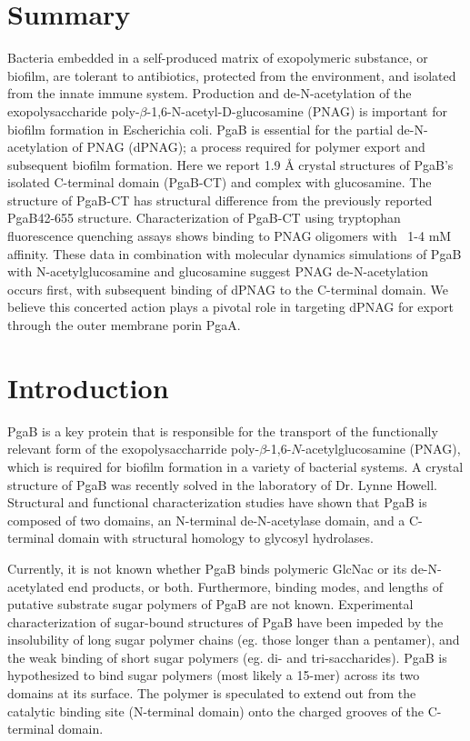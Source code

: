 \section{Summary}
Bacteria embedded in a self-produced matrix of exopolymeric substance, or biofilm, are tolerant to antibiotics, protected from the environment, and isolated from the innate immune system. Production and de-N-acetylation of the exopolysaccharide poly-$\beta$-1,6-N-acetyl-D-glucosamine (PNAG) is important for biofilm formation in Escherichia coli. PgaB is essential for the partial de-N-acetylation of PNAG (dPNAG); a process required for polymer export and subsequent biofilm formation. Here we report 1.9 Å crystal structures of PgaB’s isolated C-terminal domain (PgaB-CT) and complex with glucosamine. The structure of PgaB-CT has structural difference from the previously reported PgaB42-655 structure. Characterization of PgaB-CT using tryptophan fluorescence quenching assays shows binding to PNAG oligomers with ~1-4 mM affinity. These data in combination with molecular dynamics simulations of PgaB with N-acetylglucosamine and glucosamine suggest PNAG de-N-acetylation occurs first, with subsequent binding of dPNAG to the C-terminal domain. We believe this concerted action plays a pivotal role in targeting dPNAG for export through the outer membrane porin PgaA.

\section{Introduction}

PgaB is a key protein that is responsible for the transport of the functionally relevant form of the exopolysaccharride poly-$\beta$-1,6-$N$-acetylglucosamine (PNAG), which is required for biofilm formation in a variety of bacterial systems. A crystal structure of PgaB was recently solved in the laboratory of Dr. Lynne Howell. Structural and functional characterization studies have shown that PgaB is composed of two domains, an N-terminal de-N-acetylase domain, and a C-terminal domain with structural homology to glycosyl hydrolases.\cite{Little:2012dp}

Currently, it is not known whether PgaB binds polymeric GlcNac or its de-N-acetylated end products, or both. Furthermore, binding modes, and lengths of putative substrate sugar polymers of PgaB are not known. Experimental characterization of sugar-bound structures of PgaB have been impeded by the insolubility of long sugar polymer chains (eg. those longer than a pentamer), and the weak binding of short sugar polymers (eg. di- and tri-saccharides). PgaB is hypothesized to bind sugar polymers (most likely a 15-mer) across its two domains at its surface. The polymer is speculated to extend out from the catalytic binding site (N-terminal domain) onto the charged grooves of the C-terminal domain.

